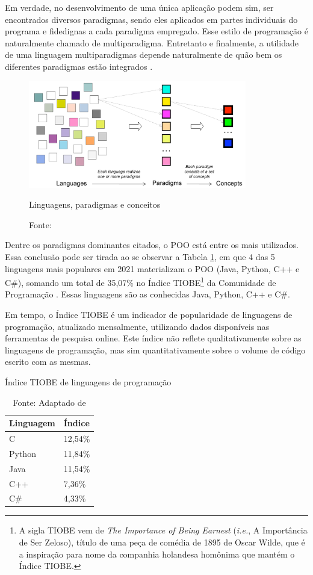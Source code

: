 Em verdade, no desenvolvimento de uma única aplicação podem sim, ser
encontrados diversos paradigmas, sendo eles aplicados em partes individuais do
programa e fidedignas a cada paradigma empregado. Esse estilo de programação é
naturalmente chamado de multiparadigma. Entretanto e finalmente, a utilidade de
uma linguagem multiparadigmas depende naturalmente de quão bem os diferentes
paradigmas estão integrados \cite{bjarne_1995,van_roy_2004}.

\begin{figure}[!htb]
  \centering
  \includegraphics[width=0.85\textwidth]{../figures/concepts.png}
  \caption{Linguagens, paradigmas e conceitos}
  \caption*{Fonte: }
  \label{fig:concepts}
\end{figure}

Dentre os paradigmas dominantes citados, o POO está entre os mais utilizados.
Essa conclusão pode ser tirada ao se observar a Tabela \ref{tab:linguagens}, em
que 4 das 5 linguagens mais populares em 2021 materializam o POO (Java, Python,
C++ e C\#), somando um total de 35,07\% no Índice TIOBE\footnote{A sigla TIOBE
  vem de \textit{The Importance of Being Earnest} (\textit{i.e.}, A Importância de
  Ser Zeloso), título de uma peça de comédia de 1895 de Oscar Wilde, que é a
  inspiração para nome da companhia holandesa homônima que mantém o Índice TIOBE.}
da Comunidade de Programação \cite{tiobe_2021}. Essas linguagens são as
conhecidas Java, Python, C++ e C\#.

Em tempo, o Índice TIOBE é um indicador de popularidade de linguagens de
programação, atualizado mensalmente, utilizando dados disponíveis nas
ferramentas de pesquisa online. Este índice não reflete qualitativamente sobre
as linguagens de programação, mas sim quantitativamente sobre o volume de código
escrito com as mesmas.

\begin{table}[!htb]
  \centering
  \caption{Índice TIOBE de linguagens de programação}
  \caption*{Fonte: Adaptado de }
  \label{tab:linguagens}
  \smallskip
  \begin{tabularx}{0.3\textwidth}{|X|l|}
    \hline
    Linguagem & Índice  \\
    \hline
    C         & 12,54\% \\
    \hline
    Python    & 11,84\% \\
    \hline
    Java      & 11,54\% \\
    \hline
    C++       & 7,36\%  \\
    \hline
    C\#       & 4,33\%  \\
    \hline
  \end{tabularx}
\end{table}

